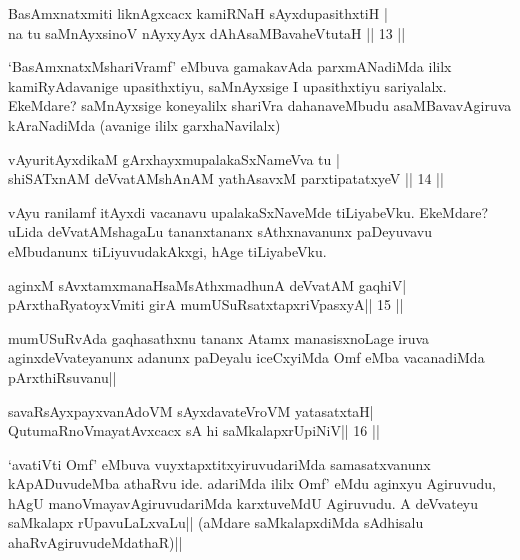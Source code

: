 \begin{shl}
BasAmxnatxmiti liknAgxcacx kamiRNaH sAyxdupasithxtiH | \\
na tu saMnAyxsinoV nAyxyAyx dAhAsaMBavaheVtutaH \hfill||  13 || 
\end{shl}

\begin{artha} 
`BasAmxnatxMshariVramf' eMbuva gamakavAda parxmANadiMda ililx 
kamiRyAdavanige upasithxtiyu, saMnAyxsige I upasithxtiyu sariyalalx. 
EkeMdare? saMnAyxsige koneyalilx shariVra dahanaveMbudu 
asaMBavavAgiruva kAraNadiMda (avanige ililx garxhaNavilalx)
\end{artha}

\begin{shl}
vAyuritAyxdikaM gArxhayxmupalakaSxNameVva tu | \\
shiSATxnAM deVvatAMshAnAM yathAsavxM parxtipatatxyeV \hfill||  14 || 
\end{shl}

\begin{artha} 
vAyu ranilamf itAyxdi vacanavu upalakaSxNaveMde tiLiyabeVku. EkeMdare? 
uLida deVvatAMshagaLu tananxtananx sAthxnavanunx paDeyuvavu eMbudanunx 
tiLiyuvudakAkxgi, hAge tiLiyabeVku.
\end{artha}


\begin{shl}
aginxM sAvxtamxmanaHsaMsAthxmadhunA deVvatAM gaqhiV| \\
pArxthaRyatoyxVmiti girA mumUSuRsatxtapxriVpasxyA\hfill ||  15 || 
\end{shl}

\begin{artha} 
mumUSuRvAda gaqhasathxnu tananx Atamx manasisxnoLage iruva 
aginxdeVvateyanunx adanunx paDeyalu iceCxyiMda Omf eMba vacanadiMda 
pArxthiRsuvanu||
\end{artha}


\begin{shl}
savaRsAyxpayxvanAdoVM sAyxdavateVroVM yatasatxtaH| \\
QutumaRnoVmayatAvxcacx sA hi saMkalapxrUpiNiV\hfill ||  16 || 
\end{shl}

\begin{artha} 
`avatiVti Omf' eMbuva vuyxtapxtitxyiruvudariMda samasatxvanunx 
kApADuvudeMba athaRvu ide. adariMda ililx Omf' eMdu aginxyu Agiruvudu, 
hAgU manoVmayavAgiruvudariMda karxtuveMdU Agiruvudu. A deVvateyu 
saMkalapx rUpavuLaLxvaLu|| (aMdare saMkalapxdiMda sAdhisalu 
ahaRvAgiruvudeMdathaR)||
\end{artha}

